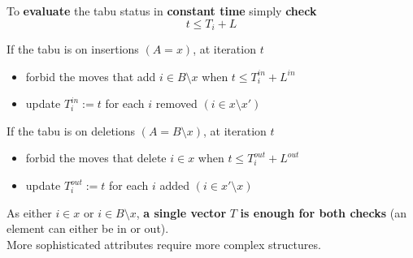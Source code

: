 \documentclass[11pt]{article}
\begin{document}
	To \textbf{evaluate} the tabu status in \textbf{constant time} simply \textbf{check}
	$$ t \leq T_i + L $$
	
	If the tabu is on insertions $(A = x)$, at iteration $t$
	\begin{itemize}
		\item forbid the moves that add $i \in B \setminus x$ when $t \leq T_i^{in} + L^{in}$
		
		\item update $T_i^{in} := t$ for each $i$ removed $(i \in x \setminus x')$
	\end{itemize}
	
	If the tabu is on deletions $(A = B \setminus x)$, at iteration $t$
	\begin{itemize}
		\item forbid the moves that delete $i \in x$ when $t \leq T_i^{out} + L^{out}$
		
		\item update $T_i^{out} := t$ for each $i$ added $(i \in x' \setminus x)$
	\end{itemize}
	
	As either $i \in x$ or $i \in B \setminus x$, \textbf{a single vector} $T$ \textbf{is enough for both checks} (an element can either be in or out).\\
	
	More sophisticated attributes require more complex structures.\\
	
	\newpage
	
\end{document}
